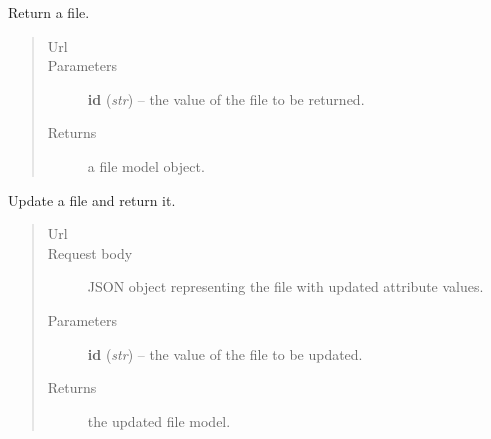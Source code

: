 \documentclass[letterpaper,10pt,english]{sphinxmanual}
\begin{document}
\begin{fulllineitems}
\begin{fulllineitems}
\begin{quote}
\begin{description}
\end{description}\end{quote}

\end{fulllineitems}


\begin{fulllineitems}
\label{api:onlinelinguisticdatabase.controllers.files.FilesController.show}
Return a file.
\begin{quote}\begin{description}
\item[{Url }] \leavevmode
{}

\item[{Parameters}] \leavevmode
\textbf{id} (\emph{str}) -- the  value of the file to be returned.

\item[{Returns}] \leavevmode
a file model object.

\end{description}\end{quote}

\end{fulllineitems}


\begin{fulllineitems}
\label{api:onlinelinguisticdatabase.controllers.files.FilesController.update}
Update a file and return it.
\begin{quote}\begin{description}
\item[{Url }] \leavevmode
{}

\item[{Request body}] \leavevmode
JSON object representing the file with updated attribute values.

\item[{Parameters}] \leavevmode
\textbf{id} (\emph{str}) -- the  value of the file to be updated.

\item[{Returns}] \leavevmode
the updated file model.

\end{description}\end{quote}

\end{fulllineitems}


\end{fulllineitems}
\end{document}
